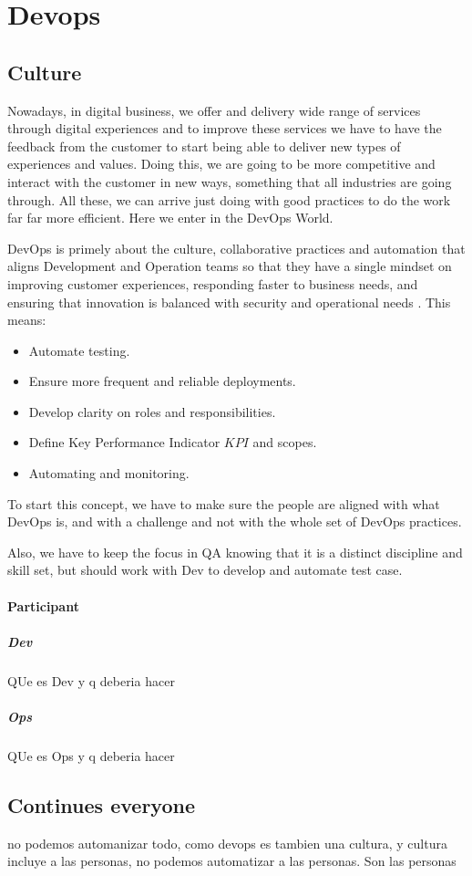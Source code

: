 \section{Devops}
\subsection{Culture}
Nowadays, in digital business, we offer and delivery wide range of services through digital experiences and to improve these services we have to have the feedback from the customer to start being able to deliver new types of experiences and values. Doing this, we are going to be more competitive and interact with the customer in new ways, something that all industries are going through.
All these, we can arrive just doing with good practices to do the work far far more efficient. Here we enter in the DevOps World.

DevOps is primely  about the culture, collaborative practices and automation that aligns Development and Operation teams so that they have a single mindset on improving customer experiences, responding faster to business needs, and ensuring that innovation is balanced with security and operational needs \cite{IsaacSacolick2016DrivingCulture}. This means:

\begin{itemize}
\item Automate testing.
\item Ensure more frequent and reliable deployments.
\item Develop clarity on roles and responsibilities.
\item Define Key Performance Indicator \(KPI\) and scopes.
\item Automating and monitoring.
\end{itemize}

To start this concept, we have to make sure the people are aligned with what DevOps is, and with a challenge and not with the whole set of DevOps practices.

Also, we have to keep the focus in QA knowing that it is a distinct discipline and skill set, but should work with Dev to develop and automate test case.

\paragraph{Participant}
\subparagraph{Dev}
QUe es Dev y q deberia hacer

\subparagraph{Ops}
QUe es Ops y q deberia hacer

\subsection{Continues everyone}
no podemos automanizar todo, como devops es tambien una cultura, y cultura incluye a las personas, no podemos automatizar a las personas.
Son las personas 
